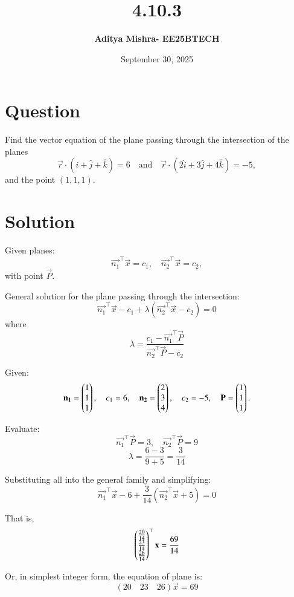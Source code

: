 \documentclass[12pt]{article}
\title{\textbf{4.10.3}}
\author{\textbf{Aditya Mishra- EE25BTECH}}
\date{September 30, 2025}
\begin{document}
\maketitle

\section*{Question}

Find the vector equation of the plane passing through the intersection of the planes
\[
\vec{r} \cdot (\hat{i} + \hat{j} + \hat{k}) = 6 \quad \text{and} \quad \vec{r} \cdot (2\hat{i} + 3\hat{j} + 4\hat{k}) = -5,
\]
and the point $(1, 1, 1)$.


\section*{Solution}

Given planes:
\[
\vec{n_1}^\top \vec{x} = c_1, \quad \vec{n_2}^\top \vec{x} = c_2,
\]
with point $\vec{P}$.


General solution for the plane passing through the intersection:
\[
\vec{n_1}^\top \vec{x} - c_1 + \lambda(\vec{n_2}^\top \vec{x} - c_2) = 0
\]
where
\[
\lambda = \frac{c_1 - \vec{n_1}^\top \vec{P}}{\vec{n_2}^\top \vec{P} - c_2}
\]

\bigskip
Given:
\[
\mathbf{n_1} = \begin{pmatrix}1 \\ 1 \\ 1\end{pmatrix},\quad c_1 = 6, \quad
\mathbf{n_2} = \begin{pmatrix}2 \\ 3 \\ 4\end{pmatrix},\quad c_2 = -5, \quad
\mathbf{P} = \begin{pmatrix}1 \\ 1 \\ 1\end{pmatrix}.
\]

Evaluate:
\[
\vec{n_1}^\top \vec{P} = 3,\quad \vec{n_2}^\top \vec{P} = 9
\]
\[
\lambda = \frac{6-3}{9+5} = \frac{3}{14}
\]

Substituting all into the general family and simplifying:
\[
\vec{n_1}^\top \vec{x} - 6 + \frac{3}{14}(\vec{n_2}^\top \vec{x} + 5) = 0
\]


That is,
\[
\begin{pmatrix}\frac{20}{14} \\ \frac{23}{14} \\ \frac{26}{14}\end{pmatrix}^\top \mathbf{x} = \frac{69}{14}
\]

Or, in simplest integer form, the equation of plane is:
\[
\boxed{
(20\quad 23\quad 26) \vec{x} = 69
}
\]
\end{document}
